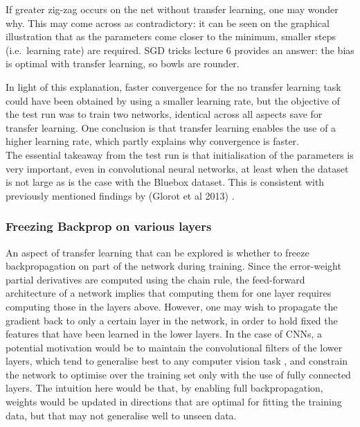 \documentclass[a4paper,11pt]{article}
\begin{document}
If greater zig-zag occurs on the net without transfer learning, one may wonder why. This may come across as contradictory: it can be seen on the graphical illustration that as the parameters come closer to the minimum, smaller steps (i.e.\ learning rate) are required. SGD tricks lecture 6 provides an answer: the bias is optimal with transfer learning, so bowls are rounder.

In light of this explanation, faster convergence for the no transfer learning task could have been obtained by using a smaller learning rate, but the objective of the test run was to train two networks, identical across all aspects save for transfer learning. One conclusion is that transfer learning enables the use of a higher learning rate, which partly explains why convergence is faster. \\

The essential takeaway from the test run is that initialisation of the parameters is very important, even in convolutional neural networks, at least when the dataset is not large as is the case with the Bluebox dataset. This is consistent with previously mentioned findings by (Glorot et al 2013) \cite{rectifier}. \\


\subsubsection{Freezing Backprop on various layers}

An aspect of transfer learning that can be explored is whether to freeze backpropagation on part of the network during training. Since the error-weight partial derivatives are computed using the chain rule, the feed-forward architecture of a network implies that computing them for one layer requires computing those in the layers above. However, one may wish to propagate the gradient back to only a certain layer in the network, in order to hold fixed the features that have been learned in the lower layers. In the case of CNNs, a potential motivation would be to maintain the convolutional filters of the lower layers, which tend to generalise best to any computer vision task \cite{transfer-learning}, and constrain the network to optimise over the training set only with the use of fully connected layers. The intuition here would be that, by enabling full backpropagation, weights would be updated in directions that are optimal for fitting the training data, but that may not generalise well to unseen data. \\
\end{document}
